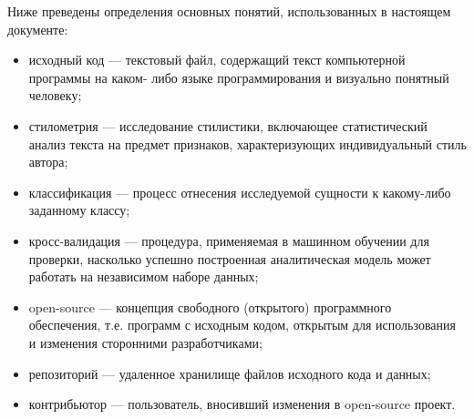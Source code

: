 Ниже преведены определения основных понятий, использованных в настоящем документе:
\begin{itemize}
 \item исходный код --- текстовый файл, содержащий текст компьютерной программы на каком-
 либо языке программирования и визуально понятный человеку;
 \item стилометрия --- исследование стилистики, включающее статистический анализ текста на предмет признаков,
 характеризующих индивидуальный стиль автора;
 \item классификация --- процесс отнесения исследуемой сущности к какому-либо заданному классу;
 \item кросс-валидация --- процедура, применяемая в машинном обучении для проверки, насколько успешно
 построенная аналитическая модель может работать на независимом наборе данных;
 \item open-source --- концепция свободного (открытого) программного обеспечения, т.е. программ с исходным кодом,
 открытым для использования и изменения сторонними разработчиками;
 \item репозиторий --- удаленное хранилище файлов исходного кода и данных;
 \item контрибьютор --- пользователь, вносивший изменения в open-source проект. 
\end{itemize}



\setlength{\parindent}{2in}
\setlength{\leftskip}{0.2in}
\setlength{\parskip}{8pt}
